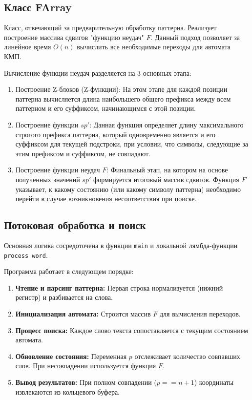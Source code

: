 \subsection{Класс FArray}

Класс, отвечающий за предварительную обработку паттерна. Реализует построение массива сдвигов "функцию неудач" $F$. Данный подход позволяет за линейное время $O(n)$ вычислить все необходимые переходы для автомата КМП.

Вычисление функции неудач разделяется на 3 основных этапа:
\begin{enumerate}
\item Построение Z-блоков (Z-функции): На этом этапе для каждой позиции паттерна вычисляется длина наибольшего общего префикса между всем паттерном и его суффиксом, начинающимся с этой позиции.
\item Построение функции $sp'$: Данная функция определяет длину максимального строгого префикса паттерна, который одновременно является и его суффиксом для текущей подстроки, при условии, что символы, следующие за этим префиксом и суффиксом, не совпадают.
\item Построение функции неудач $F$: Финальный этап, на котором на основе полученных значений $sp'$ формируется итоговый массив сдвигов. Функция $F$ указывает, к какому состоянию (или какому символу паттерна) необходимо перейти в случае возникновения несоответствия при поиске.
\end{enumerate}
\subsection{Потоковая обработка и поиск}

Основная логика сосредоточена в функции \texttt{main} и локальной лямбда-функции \texttt{process word}.

Программа работает в следующем порядке:

\begin{enumerate}
    \item \textbf{Чтение и парсинг паттерна:} Первая строка нормализуется (нижний регистр) и разбивается на слова.
    \item \textbf{Инициализация автомата:} Строится массив $F$ для вычисления переходов.
    \item \textbf{Процесс поиска:} Каждое слово текста сопоставляется с текущим состоянием автомата.
    \item \textbf{Обновление состояния:} Переменная $p$ отслеживает количество совпавших слов. При несовпадении используется функция $F$.
    \item \textbf{Вывод результатов:} При полном совпадении ($p == n + 1$) координаты извлекаются из кольцевого буфера.
\end{enumerate}

